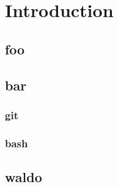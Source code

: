 \documentclass[parskip=half, titlepage=yes, 12pt, BCOR=12mm, DIV=calc]{scrartcl}
\begin{document}
\maketitle
\tableofcontents
\listoffigures
\listoftables
\lstlistoflistings
\clearpage



\section{Introduction}

\subsection{foo}

\blindtext


\subsection{bar}

\subsubsection{git}

\subsubsection{bash}

\subsection{waldo}

\Blindtext


\clearpage
\nocite{*}
\printbibliography

\appendix

\end{document}
